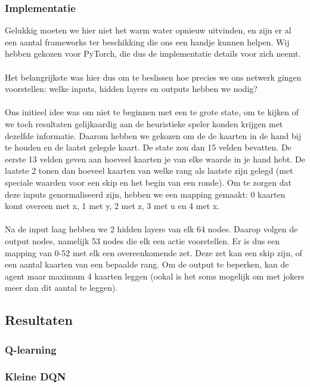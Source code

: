 \documentclass[11pt]{article}
\begin{document}
\subsubsection{Implementatie}
Gelukkig moeten we hier niet het warm water opnieuw uitvinden, en zijn er al een aantal frameworks ter beschikking die ons een handje kunnen helpen. Wij hebben gekozen voor PyTorch, die dus de implementatie details voor zich neemt.\\\\
Het belangrijkste was hier dus om te beslissen hoe precies we ons netwerk gingen voorstellen: welke inputs, hidden layers en outputs hebben we nodig?\\\\
Ons initieel idee was om niet te beginnen met een te grote state, om te kijken of we toch resultaten gelijkaardig aan de heuristieke speler konden krijgen met dezelfde informatie. Daarom hebben we gekozen om de de kaarten in de hand bij te houden en de laatst gelegde kaart. De state zou dan 15 velden bevatten. De eerste 13 velden geven aan hoeveel kaarten je van elke waarde in je hand hebt. De laatste 2 tonen dan hoeveel kaarten van welke rang als laatste zijn gelegd (met speciale waarden voor een skip en het begin van een ronde). Om te zorgen dat deze inputs genormaliseerd zijn, hebben we een mapping gemaakt: 0 kaarten komt overeen met x, 1 met y, 2 met z, 3 met u en 4 met x.\\\\
Na de input laag hebben we 2 hidden layers van elk 64 nodes. Daarop volgen de output nodes, namelijk 53 nodes die elk een actie voorstellen. Er is dus een mapping van 0-52 met elk een overeenkomende zet. Deze zet kan een skip zijn, of een aantal kaarten van een bepaalde rang. Om de output te beperken, kan de agent maar maximum 4 kaarten leggen (ookal is het soms mogelijk om met jokers meer dan dit aantal te leggen).

\newpage
\subsection{Resultaten}

\subsubsection{Q-learning}

\subsubsection{Kleine DQN}
\end{document}
